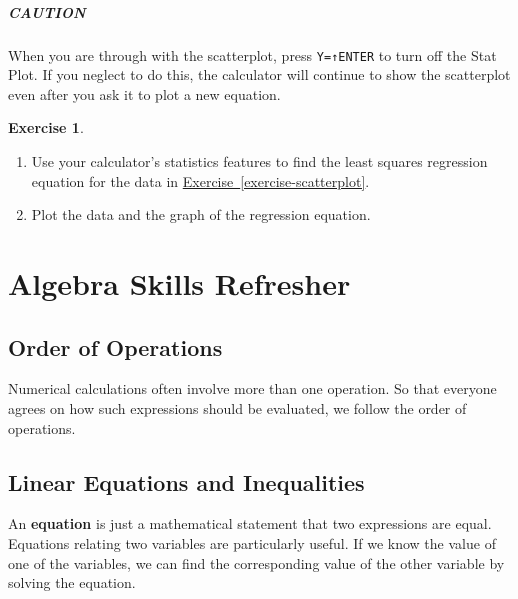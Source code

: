 \documentclass[10pt,]{book}
\newcommand{\terminology}[1]{\textbf{#1}}
\theoremstyle{plain}
\theoremstyle{definition}
\theoremstyle{definition}
\theoremstyle{definition}
\theoremstyle{definition}
\newtheorem{exercise}[theorem]{Exercise}
\numberwithin{equation}{section}
\begin{document}
\paragraph[CAUTION]{CAUTION}\label{paragraphs-4}

        When you are through with the scatterplot, press \lstinline?Y=?\lstinline?↑?\lstinline?ENTER? to turn off the Stat Plot. If you neglect to do this, the calculator will continue to show the scatterplot even after you ask it to plot a new equation.
\begin{exercise}\label{exercise-GC-regression}
\leavevmode%
\begin{enumerate}[label=*\alph**]
\item\hypertarget{li-220}{}
            Use your calculator’s statistics features to find the least squares regression equation for the data in \hyperref[exercise-scatterplot]{Exercise~\ref{exercise-scatterplot}}.
        \item\hypertarget{li-221}{}
            Plot the data and the graph of the regression equation.
        \end{enumerate}
\end{exercise}
%
%
%
\appendix
%
\typeout{************************************************}
\typeout{************************************************}
\chapter[Algebra Skills Refresher]{Algebra Skills Refresher}\label{appendix-1}
\typeout{************************************************}
\typeout{************************************************}
\section[Order of Operations]{Order of Operations}\label{Order-of-Operations}
Numerical calculations often involve more than one operation. So that everyone agrees on how such expressions should be evaluated, we follow the order of operations.%
\typeout{************************************************}
\typeout{************************************************}
\section[Linear Equations and Inequalities]{Linear Equations and Inequalities}\label{appendix-Linear-Equations-and-Inequalities}
An \terminology{equation} is just a mathematical statement that two expressions are equal. Equations relating two variables are particularly useful. If we know the value of one of the variables, we can find the corresponding value of the other variable by solving the equation.%
\typeout{************************************************}
\typeout{************************************************}
\end{document}
